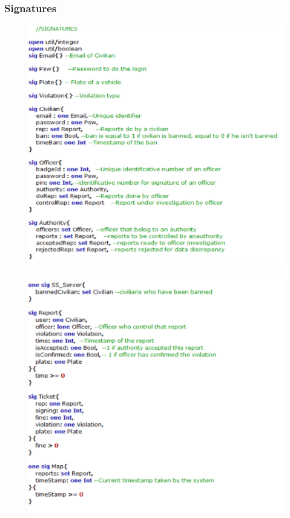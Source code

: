 \documentclass[12pt,a4paper]{article}
\begin{document}
\subsubsection{Signatures}
\begin{figure}[H]
				\centering
				\includegraphics[width=.75\paperwidth,height=.75\paperheight, keepaspectratio]{Images/Alloy/sig1}
\end{figure}
\begin{figure}[H]
				\centering
				\includegraphics[width=.7\paperwidth,height=.7\paperheight, keepaspectratio]{Images/Alloy/sig2}
\end{figure}
\end{document}
